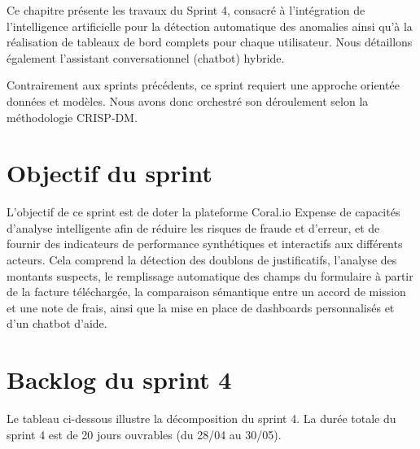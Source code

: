 \documentclass[12pt,a4paper]{report}
\begin{document}

Ce chapitre présente les travaux du Sprint 4, consacré à l'intégration de l'intelligence artificielle pour la détection automatique des anomalies ainsi qu'à la réalisation de tableaux de bord complets pour chaque utilisateur. Nous détaillons également l'assistant conversationnel (chatbot) hybride.



Contrairement aux sprints précédents, ce sprint requiert une approche orientée données et modèles. Nous avons donc orchestré son déroulement selon la méthodologie CRISP‑DM.



\section{Objectif du sprint}

L'objectif de ce sprint est de doter la plateforme Coral.io Expense de capacités d'analyse intelligente afin de réduire les risques de fraude et d'erreur, et de fournir des indicateurs de performance synthétiques et interactifs aux différents acteurs. Cela comprend la détection des doublons de justificatifs, l'analyse des montants suspects, le remplissage automatique des champs du formulaire à partir de la facture téléchargée, la comparaison sémantique entre un accord de mission et une note de frais, ainsi que la mise en place de dashboards personnalisés et d'un chatbot d'aide.



\section{Backlog du sprint 4}

Le tableau ci-dessous illustre la décomposition du sprint 4. La durée totale du sprint 4 est de 20 jours ouvrables (du 28/04 au 30/05).


\label{tab:sprint4_combined}
\end{document}
